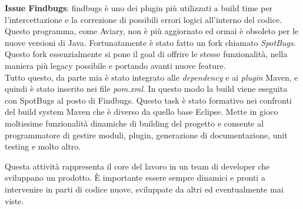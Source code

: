 \documentclass[a4paper]{article}
\begin{document}
\par \textbf{Issue Findbugs}: findbugs è uno dei plugin più utilizzati a build time 
per l'intercettazione e la correzione di possibili errori logici all'interno del codice.
Questo programma, come Aviary, non è più aggiornato ed ormai è obsoleto per le nuove
versioni di Java. Fortunatamente è stato fatto un fork chiamato \mbox{\emph{SpotBugs}}.
Questo fork essenzialmente si pone il goal di offrire le stesse fun\-zio\-na\-li\-tà, nella
maniera più legacy possibile e portando avanti nuove feature.\\
Tutto questo, da parte mia è stato integrato alle \emph{dependency} e ai \emph{plugin}
Maven, e quindi è stato inserito nei file \emph{pom.xml}. In questo modo la build viene
ese\-gui\-ta con SpotBugs al posto di Findbugs. Questo task è stato formativo nei confronti
del build system Maven che è diverso da quello base Eclipse. Mette in gioco moltissime
funzionalità dinamiche di building del progetto e consente al programmatore di gestire
moduli, plugin, generazione di documentazione, unit testing e molto altro.
\par Questa attività rappresenta il core del lavoro in un team di developer che sviluppano
un prodotto. È importante essere sempre dinamici e pronti a intervenire in parti di codice
nuove, sviluppate da altri ed eventualmente mai viste.
\newpage
\end{document}
